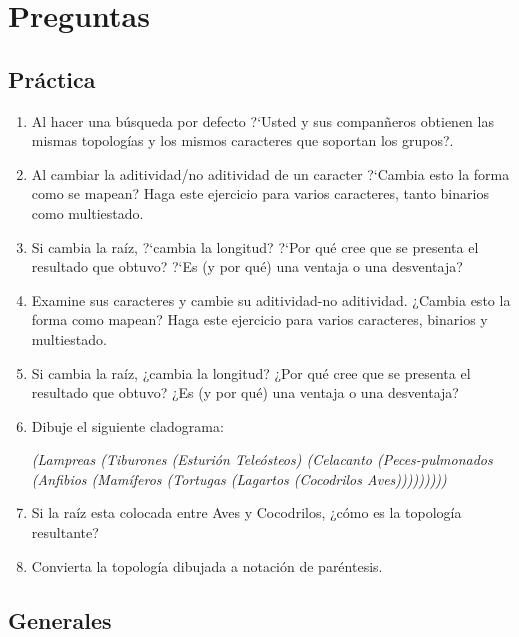 \section*{Preguntas}

\subsection*{Pr\'actica}

\begin{enumerate}

	\item Al hacer una b\'usqueda por defecto ?`Usted y sus compan\~neros obtienen las mismas topolog\'ias y los mismos caracteres que soportan los grupos?.

	\item Al cambiar la aditividad/no aditividad de un caracter  ?`Cambia esto la forma como se mapean? Haga este ejercicio para varios caracteres, tanto binarios como multiestado.

	\item Si cambia la ra\'iz, ?`cambia la longitud? ?`Por qu\'e cree que se presenta el resultado que obtuvo? ?`Es (y por qu\'e) una ventaja o una desventaja?

	\item Examine sus caracteres y cambie su aditividad-no aditividad. ¿Cambia esto la forma como mapean? Haga este ejercicio para varios caracteres, binarios y multiestado.

	\item Si cambia la ra\'iz, ¿cambia la longitud? ¿Por qu\'e cree que se presenta el resultado que obtuvo? ¿Es (y por qu\'e) una ventaja o una desventaja?

	\item Dibuje el siguiente cladograma:\\ 
	\begin{small}
	\emph{(Lampreas (Tiburones (Esturi\'on Tele\'osteos) (Celacanto (Peces-pulmonados (Anfibios (Mam\'iferos (Tortugas (Lagartos (Cocodrilos Aves)))))))))}
	\end{small}

	\item Si la ra\'iz esta colocada entre Aves y Cocodrilos, ¿c\'omo es la topolog\'ia resultante?
	
	\item Convierta la topolog\'ia dibujada a notaci\'on de par\'entesis.
\end{enumerate}

\subsection*{Generales}

